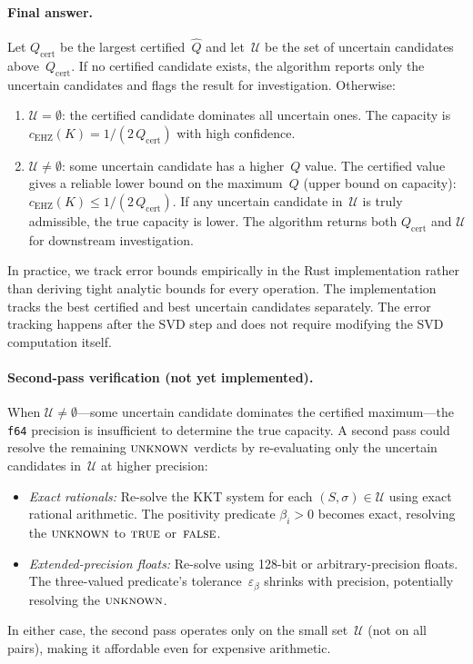 \paragraph{Final answer.}
Let $Q_{\text{cert}}$ be the largest certified~$\hat Q$
and let~$\mathcal{U}$ be the set of uncertain candidates
above~$Q_{\text{cert}}$.
If no certified candidate exists, the algorithm reports
only the uncertain candidates and flags the result for
investigation.
Otherwise:
\begin{enumerate}
\item
  $\mathcal{U} = \emptyset$:
  the certified candidate dominates all uncertain ones.
  The capacity is
  $c_{\mathrm{EHZ}}(K) = 1 / (2\, Q_{\text{cert}})$
  with high confidence.
\item
  $\mathcal{U} \neq \emptyset$:
  some uncertain candidate has a higher~$Q$ value.
  The certified value gives a reliable lower bound on the
  maximum~$Q$ (upper bound on capacity):
  $c_{\mathrm{EHZ}}(K) \leq 1 / (2\, Q_{\text{cert}})$.
  If any uncertain candidate in~$\mathcal{U}$ is truly
  admissible, the true capacity is lower.
  The algorithm returns both $Q_{\text{cert}}$ and
  $\mathcal{U}$ for downstream investigation.
\end{enumerate}

\begin{remark}\label{rem:empirical-errors}
In practice, we track error bounds empirically in the Rust
implementation rather than deriving tight analytic bounds
for every operation.
The implementation tracks the best certified and best
uncertain candidates separately.
The error tracking happens after the SVD step and does not
require modifying the SVD computation itself.
\end{remark}

\paragraph{Second-pass verification (not yet implemented).}
When $\mathcal{U} \neq \emptyset$---some uncertain candidate
dominates the certified maximum---the \texttt{f64} precision
is insufficient to determine the true capacity.
A second pass could resolve the remaining
$\textsc{unknown}$ verdicts by re-evaluating only the
uncertain candidates in~$\mathcal{U}$ at higher precision:
\begin{itemize}
\item \emph{Exact rationals:}
  Re-solve the KKT system for each $(S, \sigma) \in \mathcal{U}$
  using exact rational arithmetic.
  The positivity predicate $\beta_i > 0$ becomes exact,
  resolving the $\textsc{unknown}$ to $\textsc{true}$
  or~$\textsc{false}$.
\item \emph{Extended-precision floats:}
  Re-solve using 128-bit or arbitrary-precision floats.
  The three-valued predicate's tolerance~$\varepsilon_\beta$
  shrinks with precision, potentially resolving the
  $\textsc{unknown}$.
\end{itemize}
In either case, the second pass operates only on the
small set~$\mathcal{U}$ (not on all pairs), making it
affordable even for expensive arithmetic.

